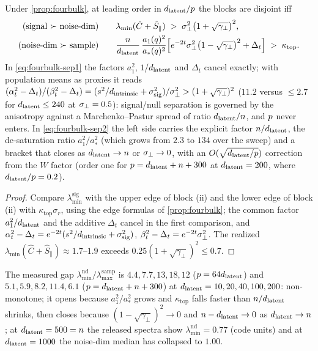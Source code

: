 \begin{corollary}\label{cor:fourbulk-separation}
Under \cref{prop:fourbulk}, at leading order in $d_{\mathrm{latent}}/p$ the blocks are disjoint iff
\begin{align}
  \text{(signal $\succ$ noise-dim)}\qquad& \lambda_{\min}(\hat C+\hat S_\parallel)\;>\;\sigma_{\perp}^2\bigl(1+\sqrt{\gamma_\perp}\bigr)^2,
  \label{eq:fourbulk-sep1}\\
  \text{(noise-dim $\succ$ sample)}\qquad& \frac{n}{d_{\mathrm{latent}}}\,\frac{a_1(q)^2}{a_*(q)^2}\Bigl[e^{-2t}\sigma_{\perp}^2\bigl(1-\sqrt{\gamma_\perp}\bigr)^2+\Delta_t\Bigr]\;>\;\kappa_{\mathrm{top}} .
  \label{eq:fourbulk-sep2}
\end{align}
In \eqref{eq:fourbulk-sep1} the factors $a_1^2$, $1/d_{\mathrm{latent}}$ and $\Delta_t$ cancel exactly; with population means as proxies it reads $(\alpha_t^2-\Delta_t)/(\beta_t^2-\Delta_t)=(s^2/d_{\mathrm{intrinsic}}+\sigma_{\mathrm{sig}}^2)/\sigma_{\perp}^2>(1+\sqrt{\gamma_\perp})^2$ ($11.2$ versus $\le2.7$ for $d_{\mathrm{latent}}\le240$ at $\sigma_{\perp}=0.5$): signal/null separation is governed by the anisotropy against a Marchenko--Pastur spread of ratio $d_{\mathrm{latent}}/n$, and $p$ never enters. In \eqref{eq:fourbulk-sep2} the left side carries the explicit factor $n/d_{\mathrm{latent}}$, the de-saturation ratio $a_1^2/a_*^2$ (which grows from $2.3$ to $134$ over the sweep) and a bracket that closes as $d_{\mathrm{latent}}\to n$ or $\sigma_{\perp}\to0$, with an $O(\sqrt{d_{\mathrm{latent}}/p})$ correction from the $W$ factor (order one for $p=d_{\mathrm{latent}}+n+300$ at $d_{\mathrm{latent}}=200$, where $d_{\mathrm{latent}}/p=0.2$).
\end{corollary}
\begin{proof}
Compare $\lambda^{\mathrm{sig}}_{\min}$ with the upper edge of block (ii) and the lower edge of block (ii) with $\kappa_{\mathrm{top}}\sigma_r$, using the edge formulas of \cref{prop:fourbulk}; the common factor $a_1^2/d_{\mathrm{latent}}$ and the additive $\Delta_t$ cancel in the first comparison, and $\alpha_t^2-\Delta_t=e^{-2t}(s^2/d_{\mathrm{intrinsic}}+\sigma_{\mathrm{sig}}^2)$, $\beta_t^2-\Delta_t=e^{-2t}\sigma_{\perp}^2$. The realized $\lambda_{\min}(\hat C+\hat S_\parallel)\approx1.7$--$1.9$ exceeds $0.25(1+\sqrt{\gamma_\perp})^2\le0.7$.
\end{proof}
The measured gap $\lambda^{\mathrm{nd}}_{\min}/\lambda^{\mathrm{samp}}_{\max}$ is $4.4,7.7,13,18,12$ ($p=64d_{\mathrm{latent}}$) and $5.1,5.9,8.2,11.4,6.1$ ($p=d_{\mathrm{latent}}+n+300$) at $d_{\mathrm{latent}}=10,20,40,100,200$: non-monotone; it opens because $a_1^2/a_*^2$ grows and $\kappa_{\mathrm{top}}$ falls faster than $n/d_{\mathrm{latent}}$ shrinks, then closes because $(1-\sqrt{\gamma_\perp})^2\to0$ and $n-d_{\mathrm{latent}}\to0$ as $d_{\mathrm{latent}}\to n$; at $d_{\mathrm{latent}}=500=n$ the released spectra show $\lambda^{\mathrm{nd}}_{\min}=0.77$ (code units) and at $d_{\mathrm{latent}}=1000$ the noise-dim median has collapsed to $1.00$.

